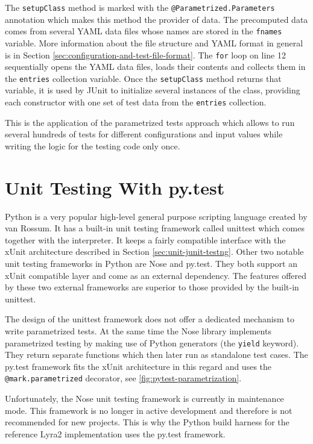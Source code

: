 The \texttt{setupClass} method is marked with the \texttt{@Parametrized.Parameters} annotation which makes this method the provider of data. The precomputed data comes from several YAML data files whose names are stored in the \texttt{fnames} variable. More information about the file structure and YAML format in general is in Section \ref{sec:configuration-and-test-file-format}. The \texttt{for} loop on line 12 sequentially opens the YAML data files, loads their contents and collects them in the \texttt{entries} collection variable. Once the \texttt{setupClass} method returns that variable, it is used by JUnit to initialize several instances of the class, providing each constructor with one set of test data from the \texttt{entries} collection.

This is the application of the parametrized tests approach which allows to run several hundreds of tests for different configurations and input values while writing the logic for the testing code only once.

\section{Unit Testing With py.test}
\label{sec:unit-pytest}

Python is a very popular high-level general purpose scripting language created by van Rossum. It has a built-in unit testing framework called unittest which comes together with the interpreter. It keeps a fairly compatible interface with the xUnit architecture described in Section \ref{sec:unit-junit-testng}. Other two notable unit testing frameworks in Python are Nose and py.test. They both support an xUnit compatible layer and come as an external dependency. The features offered by these two external frameworks are superior to those provided by the built-in unittest.

The design of the unittest framework does not offer a dedicated mechanism to write parametrized tests. At the same time the Nose library implements parametrized testing by making use of Python generators (the \texttt{yield} keyword). They return separate functions which then later run as standalone test cases. The py.test framework fits the xUnit architecture in this regard and uses the \texttt{@mark.parametrized} decorator, see \autoref{fig:pytest-parametrization}.

Unfortunately, the Nose unit testing framework is currently in maintenance mode. This framework is no longer in active development and therefore is not recommended for new projects. This is why the Python build harness for the reference Lyra2 implementation uses the py.test framework.

